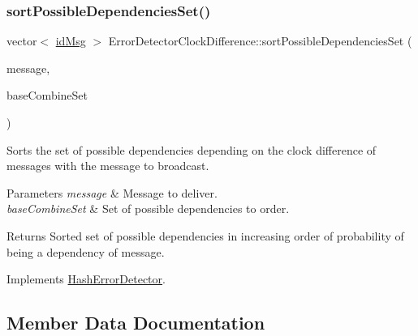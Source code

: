 \subsubsection{\texorpdfstring{sort\+Possible\+Dependencies\+Set()}{sortPossibleDependenciesSet()}}
{\footnotesize\ttfamily vector$<$ \hyperlink{structures_8h_a83a1d9a070efa5341da84cfd8e28d3e5}{id\+Msg} $>$ Error\+Detector\+Clock\+Difference\+::sort\+Possible\+Dependencies\+Set (\begin{DoxyParamCaption}\item[{const \hyperlink{structures_8h_a7e7bdc1d2fff8a9436f2f352b2711ed6}{message\+Info} \&}]{message,  }\item[{const vector$<$ \hyperlink{structures_8h_a7e7bdc1d2fff8a9436f2f352b2711ed6}{message\+Info} $>$ \&}]{base\+Combine\+Set }\end{DoxyParamCaption})\hspace{0.3cm}{\ttfamily [virtual]}}



Sorts the set of possible dependencies depending on the clock difference of messages with the message to broadcast. 


\begin{DoxyParams}{Parameters}
{\em message} & Message to deliver. \\
\hline
{\em base\+Combine\+Set} & Set of possible dependencies to order. \\
\hline
\end{DoxyParams}
\begin{DoxyReturn}{Returns}
Sorted set of possible dependencies in increasing order of probability of being a dependency of message. 
\end{DoxyReturn}


Implements \hyperlink{class_hash_error_detector_aa7952b99e47ca7cef6dae2a271885599}{Hash\+Error\+Detector}.



\subsection{Member Data Documentation}
\mbox{\label{class_error_detector_clock_difference_a0d2a3c4111e8bb4b3c232aacca9a0062}} 
